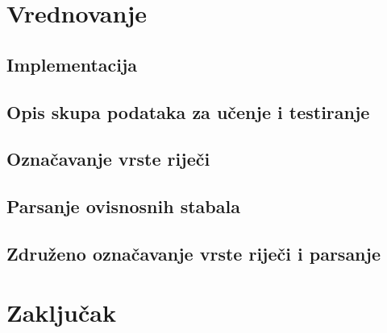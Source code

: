 \documentclass[times, utf8, diplomski]{fer}
\begin{document}
\chapter{Vrednovanje}\label{ch:evaluation}

\section{Implementacija}


\section{Opis skupa podataka za učenje i testiranje}


\section{Označavanje vrste riječi}


\section{Parsanje ovisnosnih stabala}


\section{Združeno označavanje vrste riječi i parsanje}


\chapter{Zaključak}









\end{document}
